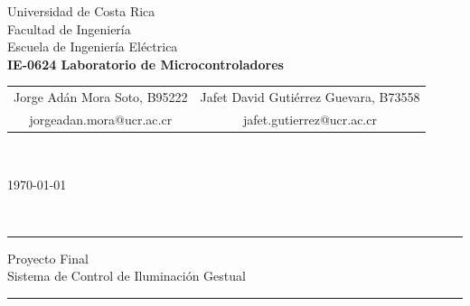 \thispagestyle{empty}
\begin{center}
    \LARGE{\sc Universidad de Costa Rica}\\[-1mm]\Large{Facultad de Ingeniería}\\[-1mm]\Large{Escuela de Ingeniería} Eléctrica\\[2mm]\large{\textbf{IE-0624 Laboratorio de Microcontroladores}}
    \\[-0.10mm]
\begin{table}[H]
\centering
\begin{tabular}{cc}
Jorge Adán Mora Soto, B95222 & Jafet David Gutiérrez Guevara, B73558 \\
 \textcolor{ucrblue}{ \small{jorgeadan.mora@ucr.ac.cr}}    &  \textcolor{ucrblue}{ \small{jafet.gutierrez@ucr.ac.cr}}
\end{tabular}
\\[-6mm]
\end{table}
\large{\today}
\end{center}


\\[-1.5cm]
\hrule
\begin{center}
\Large{Proyecto Final}\\ \large{Sistema de Control de Iluminación Gestual}
\\[4mm]
\end{center}
\hrule
\vspace{8mm}